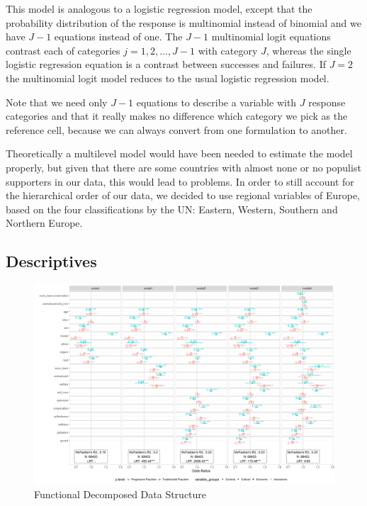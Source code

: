 \documentclass[]{article}
\begin{document}
This model is analogous to a logistic regression model, except that the
probability distribution of the response is multinomial instead of
binomial and we have \(J-1\) equations instead of one. The \(J-1\)
multinomial logit equations contrast each of categories
\(j = 1, 2, \ldots, J-1\) with category \(J\), whereas the single
logistic regression equation is a contrast between successes and
failures. If \(J=2\) the multinomial logit model reduces to the usual
logistic regression model.

Note that we need only \(J-1\) equations to describe a variable with
\(J\) response categories and that it really makes no difference which
category we pick as the reference cell, because we can always convert
from one formulation to another.

Theoretically a multilevel model would have been needed to estimate the
model properly, but given that there are some countries with almost none
or no populist supporters in our data, this would lead to problems. In
order to still account for the hierarchical order of our data, we
decided to use regional variables of Europe, based on the four
classifications by the UN: Eastern, Western, Southern and Northern
Europe.

\subsection{Descriptives}\label{descriptives}

\begin{landscape}
\vspace*{\fill}
\begin{figure}[htpb]
  \includegraphics[height=1.2\textheight, width=1.5\textwidth]{images/onebigmotherfucker.png}
  \caption{Functional Decomposed Data Structure}
\end{figure}
\vfill
\end{landscape}
\end{document}
